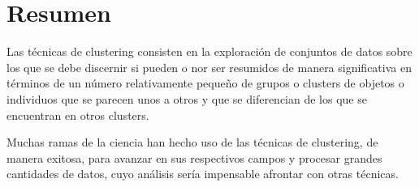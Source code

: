 \section{Resumen}

Las técnicas de clustering consisten en la exploración de conjuntos de datos sobre los que se debe discernir si pueden o nor ser resumidos de manera significativa en términos de un número relativamente pequeño de grupos o clusters de objetos o individuos que se parecen unos a otros y que se diferencian de los que se encuentran en otros clusters.

Muchas ramas de la ciencia han hecho uso de las técnicas de clustering, de manera exitosa, para avanzar en sus respectivos campos y procesar grandes cantidades de datos, cuyo análisis sería impensable afrontar con otras técnicas.

\let\cleardoublepage\relax





















